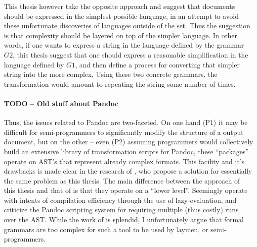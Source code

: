\documentclass{scrreprt}
\begin{document}

This thesis however take the opposite approach and suggest that documents should be expressed in the simplest possible language, in an attempt to avoid these unfortunate discoveries of languages outside of the set. Thus the suggestion is that complexity should be layered on top of the simpler language. In other words, if one wants to express a string in the language defined by the grammar $G2$, this thesis suggest that one should express a reasonable simplification in the language defined by $G1$, and then define a process for converting that simpler string into the more complex. Using these two concrete grammars, the transformation would amount to repeating the string some number of times.







\paragraph{TODO -- Old stuff about Pandoc}

Thus, the issues related to Pandoc are two-faceted. On one hand (P1) it may be difficult for semi-programmers to significantly modify the structure of a output document, but on the other -- even (P2) assuming programmers would collectively build an extensive library of transformation scripts for Pandoc, these ``packages'' operate on AST's that represent already complex formats. This facility and it's drawbacks is made clear in the research of \citet{krijnen}, who propose a solution for essentially the same problem as this thesis. The main difference between the approach of this thesis and that of \citet{krijnen} is that they operate on a ``lower level''. Seemingly \citet{krijnen} operate with intents of compilation efficiency through the use of lazy-evaluation, and criticize the Pandoc scripting system for requiring multiple (thus costly) runs over the AST. While the work of \citet{krijnen} is splendid, I unfortunately argue that formal grammars are too complex for such a tool to be used by laymen, or semi-programmers.
\end{document}
